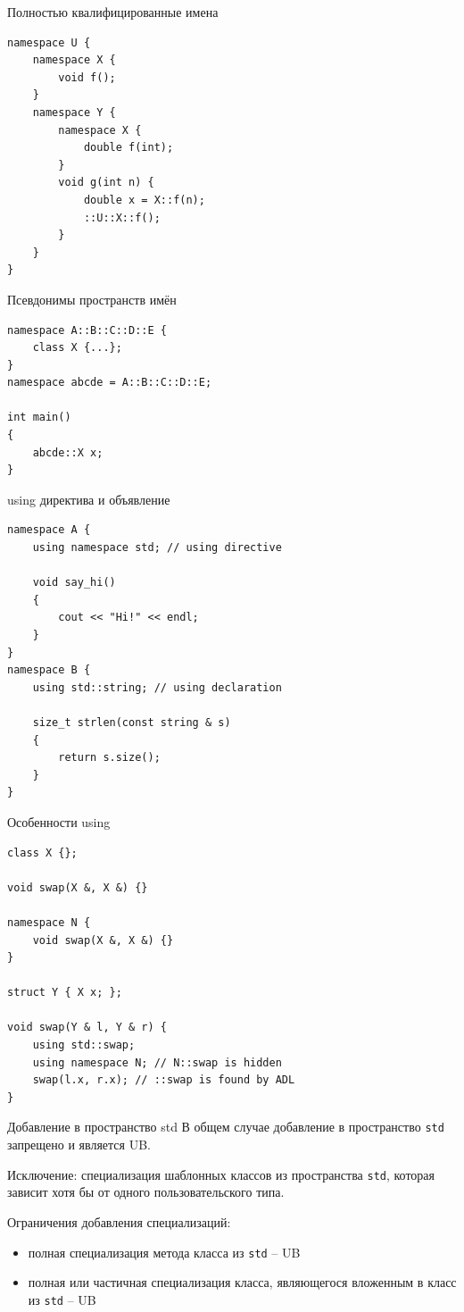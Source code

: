 \documentclass[unknownkeysallowed,xcolor=table]{beamer}
\begin{document}
\begin{frame}[fragile]{Полностью квалифицированные имена}
\begin{lstlisting}
namespace U {
    namespace X {
        void f();
    }
    namespace Y {
        namespace X {
            double f(int);
        }
        void g(int n) {
            double x = X::f(n);
            ::U::X::f();
        }
    }
}
\end{lstlisting}
\end{frame}

\begin{frame}[fragile]{Псевдонимы пространств имён}
\begin{lstlisting}
namespace A::B::C::D::E {
    class X {...};
}
namespace abcde = A::B::C::D::E;

int main()
{
    abcde::X x;
}
\end{lstlisting}
\end{frame}

\begin{frame}[fragile]{using директива и объявление}
\begin{lstlisting}
namespace A {
    using namespace std; // using directive
    
    void say_hi()
    {
        cout << "Hi!" << endl;
    }
}
namespace B {
    using std::string; // using declaration
    
    size_t strlen(const string & s)
    {
        return s.size();
    }
}
\end{lstlisting}
\end{frame}

\begin{frame}[fragile]{Особенности using}
\begin{lstlisting}
class X {};

void swap(X &, X &) {}

namespace N {
    void swap(X &, X &) {}
}

struct Y { X x; };

void swap(Y & l, Y & r) {
    using std::swap;
    using namespace N; // N::swap is hidden
    swap(l.x, r.x); // ::swap is found by ADL
}
\end{lstlisting}
\end{frame}

\begin{frame}{Добавление в пространство std}
В общем случае добавление в пространство \lstinline{std} запрещено и является UB.

\vspace{1em}

Исключение: специализация шаблонных классов из пространства \lstinline{std}, которая зависит хотя бы от одного пользовательского типа.

\vspace{1em}

Ограничения добавления специализаций:
\begin{itemize}
  \item полная специализация метода класса из \lstinline{std} -- UB
  \item полная или частичная специализация класса, являющегося вложенным в класс из \lstinline{std} -- UB
\end{itemize}
\end{frame}
\end{document}
